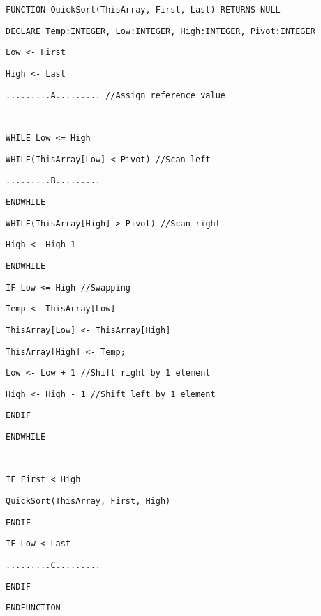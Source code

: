 \noindent %
\noindent\begin{minipage}[t]{1\columnwidth}%
\texttt{FUNCTION QuickSort(ThisArray, First, Last) RETURNS NULL }

\texttt{\qquad{}DECLARE Temp:INTEGER, Low:INTEGER, High:INTEGER,
Pivot:INTEGER }

\texttt{\qquad{}Low <- First }

\texttt{\qquad{}High <- Last }

\texttt{\qquad{}.........A......... //Assign reference value }

\texttt{\bigskip{}
}

\texttt{\qquad{}WHILE Low <= High }

\texttt{\qquad{}\qquad{}WHILE(ThisArray{[}Low{]} < Pivot) //Scan
left}

\texttt{\qquad{}\qquad{}\qquad{}.........B......... }

\texttt{\qquad{}\qquad{}ENDWHILE }

\texttt{\qquad{}\qquad{}WHILE(ThisArray{[}High{]} > Pivot) //Scan
right}

\texttt{\qquad{}\qquad{}\qquad{}High <- High \textendash{} 1 }

\texttt{\qquad{}\qquad{}ENDWHILE}

\texttt{\qquad{}\qquad{}IF Low <= High //Swapping }

\texttt{\qquad{}\qquad{}\qquad{}Temp <- ThisArray{[}Low{]} }

\texttt{\qquad{}\qquad{}\qquad{}ThisArray{[}Low{]} <- ThisArray{[}High{]} }

\texttt{\qquad{}\qquad{}\qquad{}ThisArray{[}High{]} <- Temp; }

\texttt{\qquad{}\qquad{}\qquad{}Low <- Low + 1 //Shift right by
1 element}

\texttt{\qquad{}\qquad{}\qquad{}High <- High - 1 //Shift left by
1 element }

\texttt{\qquad{}\qquad{}ENDIF}

\texttt{\qquad{}ENDWHILE}

\texttt{\bigskip{}
}

\texttt{\qquad{}IF First < High }

\texttt{\qquad{}\qquad{}QuickSort(ThisArray, First, High)}

\texttt{\qquad{}ENDIF}

\texttt{\qquad{}IF Low < Last}

\texttt{\qquad{}\qquad{}.........C.........}

\texttt{\qquad{}ENDIF}

\texttt{ENDFUNCTION }%
\end{minipage}


